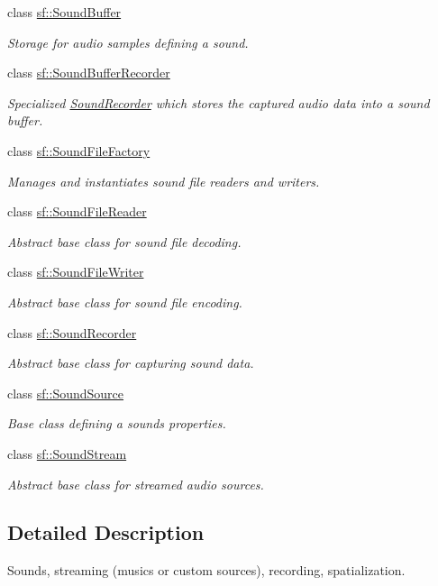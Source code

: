 \begin{DoxyCompactItemize}
class \mbox{\hyperlink{classsf_1_1_sound_buffer}{sf\+::\+Sound\+Buffer}}
\begin{DoxyCompactList}\small\item\em Storage for audio samples defining a sound. \end{DoxyCompactList}\item 
class \mbox{\hyperlink{classsf_1_1_sound_buffer_recorder}{sf\+::\+Sound\+Buffer\+Recorder}}
\begin{DoxyCompactList}\small\item\em Specialized \mbox{\hyperlink{classsf_1_1_sound_recorder}{Sound\+Recorder}} which stores the captured audio data into a sound buffer. \end{DoxyCompactList}\item 
class \mbox{\hyperlink{classsf_1_1_sound_file_factory}{sf\+::\+Sound\+File\+Factory}}
\begin{DoxyCompactList}\small\item\em Manages and instantiates sound file readers and writers. \end{DoxyCompactList}\item 
class \mbox{\hyperlink{classsf_1_1_sound_file_reader}{sf\+::\+Sound\+File\+Reader}}
\begin{DoxyCompactList}\small\item\em Abstract base class for sound file decoding. \end{DoxyCompactList}\item 
class \mbox{\hyperlink{classsf_1_1_sound_file_writer}{sf\+::\+Sound\+File\+Writer}}
\begin{DoxyCompactList}\small\item\em Abstract base class for sound file encoding. \end{DoxyCompactList}\item 
class \mbox{\hyperlink{classsf_1_1_sound_recorder}{sf\+::\+Sound\+Recorder}}
\begin{DoxyCompactList}\small\item\em Abstract base class for capturing sound data. \end{DoxyCompactList}\item 
class \mbox{\hyperlink{classsf_1_1_sound_source}{sf\+::\+Sound\+Source}}
\begin{DoxyCompactList}\small\item\em Base class defining a sound\textquotesingle{}s properties. \end{DoxyCompactList}\item 
class \mbox{\hyperlink{classsf_1_1_sound_stream}{sf\+::\+Sound\+Stream}}
\begin{DoxyCompactList}\small\item\em Abstract base class for streamed audio sources. \end{DoxyCompactList}\end{DoxyCompactItemize}


\subsection{Detailed Description}
Sounds, streaming (musics or custom sources), recording, spatialization. \begin{DoxyVerb}\end{DoxyVerb}
 